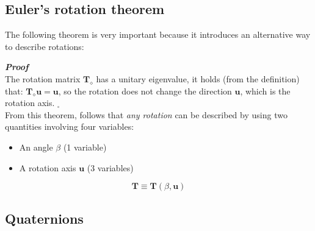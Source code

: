 \subsection{Euler's rotation theorem}
The following theorem is very important because it introduces an alternative way to describe rotations: \\

\hspace*{-5mm}
%

\vspace{0.5cm}
\noindent
\textbf{\textit{Proof}}\\
The rotation matrix $\mathbf{T}_{\diamond}$ has a unitary eigenvalue, it holds (from the definition) that: $\mathbf{T}_{\diamond}\mathbf{u}=\mathbf{u}$, so the rotation does not change the direction $\mathbf{u}$, which is the rotation axis. $_\square$\\

From this theorem, follows that \textit{any rotation} can be described by using two quantities involving four variables: 
\begin{itemize}
    \itemsep0em
    \item[\ding{70}] An angle $\beta$ (1 variable)
    \item[\ding{70}] A rotation axis $\mathbf{u}$ (3 variables)
\end{itemize}
\huge{
\begin{equation*}
    \mathbf{T} \equiv \mathbf{T}(\beta, \mathbf{u})
\end{equation*}}





\subsection{Quaternions}